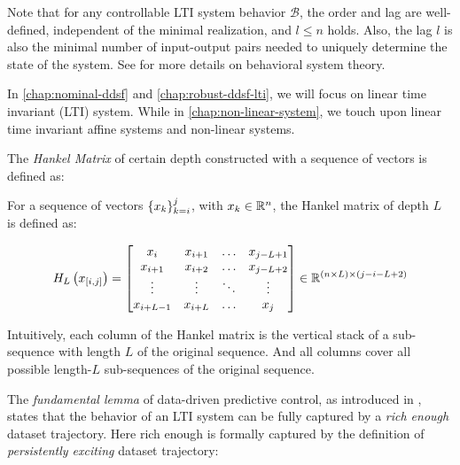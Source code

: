 \begin{remark}\label{remark:order-lag}
    Note that for any controllable LTI system behavior $\mathscr{B}$, the order and lag are well-defined, independent of the minimal realization, and $l \leq n$ holds.
    Also, the lag $l$ is also the minimal number of input-output pairs needed to uniquely determine the state of the system.
    See \cite{markovsky_behavioral_2021} for more details on behavioral system theory.
\end{remark}

In \cref{chap:nominal-ddsf} and \cref{chap:robust-ddsf-lti}, we will focus on linear time invariant (LTI) system.
While in \cref{chap:non-linear-system}, we touch upon linear time invariant affine systems and non-linear systems.

The \emph{Hankel Matrix} of certain depth constructed with a sequence of vectors is defined as:

\begin{definition}\label{def:hankel-matrix}
    For a sequence of vectors $\left\{x_k\right\}_{k=i}^{j}$, with $x_k \in \mathbb{R}^n$, the Hankel matrix of depth $L$ is defined as:

    \begin{equation*}
        H_{L}\left( x_{\left[ i, j \right]} \right) = \begin{bmatrix}
            x_i & x_{i+1} & \ldots & x_{j-L+1} \\
            x_{i+1} & x_{i+2} & \ldots & x_{j-L+2} \\
            \vdots & \vdots & \ddots & \vdots \\
            x_{i+L-1} & x_{i+L} & \ldots & x_{j}
        \end{bmatrix} \in \mathbb{R}^{(n \times L) \times (j-i-L+2)}
    \end{equation*}

\end{definition}

Intuitively, each column of the Hankel matrix is the vertical stack of a sub-sequence with length $L$ of the original sequence. 
And all columns cover all possible length-$L$ sub-sequences of the original sequence.

The \emph{fundamental lemma} of data-driven predictive control, as introduced in \cite{willems_fundamental_2005}, states that the behavior of an LTI system can be fully captured by a \emph{rich enough} dataset trajectory.
Here rich enough is formally captured by the definition of \emph{persistently exciting} dataset trajectory:

